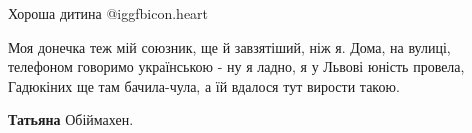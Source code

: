 \begin{itemize}
 
Хороша дитина @igg{fbicon.heart}

 

Моя донечка теж мій союзник, ще й завзятіший, ніж я. Дома, на вулиці, телефоном
говоримо українською - ну я ладно, я у Львові юність провела, Гадюкіних ще там
бачила-чула, а їй вдалося тут вирости такою.

\begin{itemize} %
 
\textbf{Татьяна}
Обіймахен.
\end{itemize} %

\end{itemize} %

